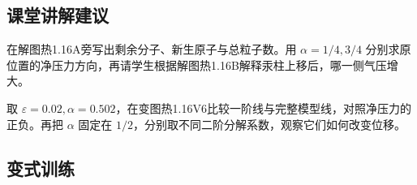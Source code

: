\documentclass[UTF8,fontset=fandol,a4paper,11pt]{ctexart}
\begin{document}


\subsection*{课堂讲解建议}

在解图热1.16A旁写出剩余分子、新生原子与总粒子数。用 $\alpha=1/4,3/4$ 分别求原位置的净压力方向，再请学生根据解图热1.16B解释汞柱上移后，哪一侧气压增大。

取 $\varepsilon=0.02,\alpha=0.502$，在变图热1.16V6比较一阶线与完整模型线，对照净压力的正负。再把 $\alpha$ 固定在 $1/2$，分别取不同二阶分解系数，观察它们如何改变位移。




\subsection*{变式训练}
\end{document}
